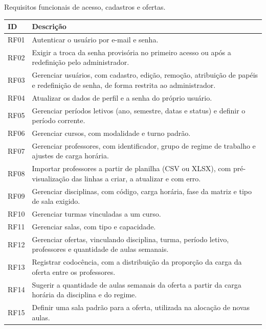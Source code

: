 \begin{quadro}[H]
\centering
\small
\renewcommand{\arraystretch}{1.25}
\caption{Requisitos funcionais de acesso, cadastros e ofertas.}
\label{quadro_rf_cadastros}
\begin{tabularx}{\textwidth}{|I|X|}
\hline
\textbf{ID} & \textbf{Descrição} \\ \hline
{}
RF01 & Autenticar o usuário por e-mail e senha. \\ \hline
RF02 & Exigir a troca da senha provisória no primeiro acesso ou após a redefinição pelo administrador. \\ \hline
RF03 & Gerenciar usuários, com cadastro, edição, remoção, atribuição de papéis e redefinição de senha, de forma restrita ao administrador. \\ \hline
RF04 & Atualizar os dados de perfil e a senha do próprio usuário. \\ \hline
{}
RF05 & Gerenciar períodos letivos (ano, semestre, datas e status) e definir o período corrente. \\ \hline
RF06 & Gerenciar cursos, com modalidade e turno padrão. \\ \hline
RF07 & Gerenciar professores, com identificador, grupo de regime de trabalho e ajustes de carga horária. \\ \hline
RF08 & Importar professores a partir de planilha (CSV ou XLSX), com pré-visualização das linhas a criar, a atualizar e com erro. \\ \hline
RF09 & Gerenciar disciplinas, com código, carga horária, fase da matriz e tipo de sala exigido. \\ \hline
RF10 & Gerenciar turmas vinculadas a um curso. \\ \hline
RF11 & Gerenciar salas, com tipo e capacidade. \\ \hline
{}
RF12 & Gerenciar ofertas, vinculando disciplina, turma, período letivo, professores e quantidade de aulas semanais. \\ \hline
RF13 & Registrar codocência, com a distribuição da proporção da carga da oferta entre os professores. \\ \hline
RF14 & Sugerir a quantidade de aulas semanais da oferta a partir da carga horária da disciplina e do regime. \\ \hline
RF15 & Definir uma sala padrão para a oferta, utilizada na alocação de novas aulas. \\ \hline
\end{tabularx}
\end{quadro}

